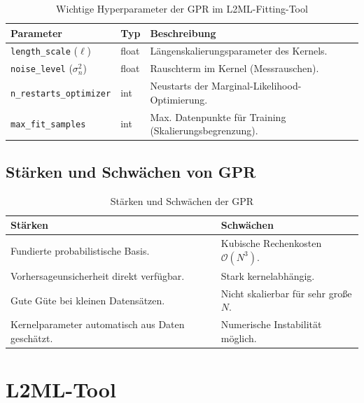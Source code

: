 \documentclass[11pt,a4paper]{report}
\begin{document}
\begin{table}[H]
\centering
\caption{Wichtige Hyperparameter der GPR im L2ML-Fitting-Tool}
\label{tab:gpr_params}
\begin{tabular}{p{4.5cm}p{2cm}p{7cm}}
\toprule
\textbf{Parameter} & \textbf{Typ} & \textbf{Beschreibung} \\
\midrule
\texttt{length\_scale} ($\ell$) & float & L\"{a}ngenskalierungsparameter des Kernels. \\
\texttt{noise\_level} ($\sigma_n^2$) & float & Rauschterm im Kernel (Messrauschen). \\
\texttt{n\_restarts\_optimizer} & int & Neustarts der Marginal-Likelihood-Optimierung. \\
\texttt{max\_fit\_samples} & int & Max. Datenpunkte f\"{u}r Training (Skalierungsbegrenzung). \\
\bottomrule
\end{tabular}
\end{table}

\section{St\"{a}rken und Schw\"{a}chen von GPR}

\begin{table}[H]
\centering
\caption{St\"{a}rken und Schw\"{a}chen der GPR}
\label{tab:gpr_pros_cons}
\begin{tabular}{p{6.5cm}p{6.5cm}}
\toprule
\textbf{St\"{a}rken} & \textbf{Schw\"{a}chen} \\
\midrule
Fundierte probabilistische Basis. & Kubische Rechenkosten $\mathcal{O}(N^3)$. \\
Vorhersageunsicherheit direkt verf\"{u}gbar. & Stark kernelabh\"{a}ngig. \\
Gute G\"{u}te bei kleinen Datens\"{a}tzen. & Nicht skalierbar f\"{u}r sehr gro\ss{}e $N$. \\
Kernelparameter automatisch aus Daten gesch\"{a}tzt. & Numerische Instabilit\"{a}t m\"{o}glich. \\
\bottomrule
\end{tabular}
\end{table}

\chapter{L2ML-Tool}
\end{document}
